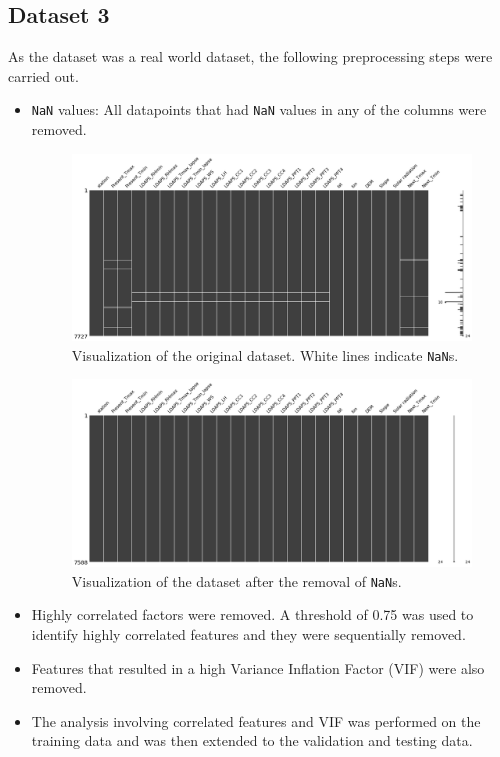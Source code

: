 \documentclass[12pt,a4paper]{article}
\def\tt#1{\texttt{#1}}
\begin{document}
\subsection{Dataset 3}
As the dataset was a real world dataset, the following preprocessing steps were carried out.
\begin{itemize}
    \itemsep0em
    \item \tt{NaN} values: All datapoints that had \tt{NaN} values in any of the columns were removed. 
        \begin{figure}[H]
            \centering
            \includegraphics[scale=0.3]{images/missingno.png}
            \caption{Visualization of the original dataset. White lines indicate \tt{NaN}s.}
        \end{figure}

        \begin{figure}[H]
            \centering
            \includegraphics[scale=0.3]{images/cleaned.png}
            \caption{Visualization of the dataset after the removal of \tt{NaN}s.}
        \end{figure}

    \item Highly correlated factors were removed. A threshold of 0.75 was used to identify highly correlated features and they were sequentially removed.
    \item Features that resulted in a high Variance Inflation Factor (VIF) were also removed.
    \item The analysis involving correlated features and VIF was performed on the training data and was then extended to the validation and testing data. 
\end{itemize}
\end{document}
